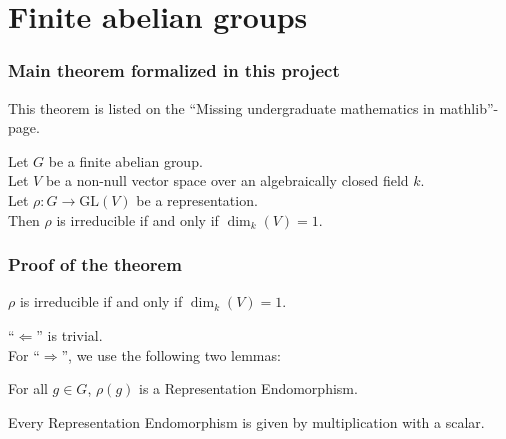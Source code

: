 \documentclass{beamer}
\newcommand{\GL}{\text{GL}}
\begin{document}
\section{Finite abelian groups}
\begin{frame}
\frametitle{Main theorem formalized in this project}
This theorem is listed on the \enquote{Missing undergraduate mathematics in mathlib}-page.
\pause
\begin{theorem}
Let \(G\) be a finite abelian group.\\
Let \(V\) be a non-null vector space over an algebraically closed field \(k\).\\
Let \(\rho: G \to \GL (V)\) be a representation.\\
\pause
\vspace{1cm}
Then \(\rho\) is irreducible if and only if \(\dim_k(V) = 1\).
\end{theorem}
\end{frame}

\begin{frame}
\frametitle{Proof of the theorem}
\begin{theorem}
\(\rho\) is irreducible if and only if \(\dim_k(V) = 1\).
\end{theorem}
\pause
\enquote{\(\Leftarrow\)} is trivial.\\
\pause
For \enquote{\(\Rightarrow\)}, we use the following two lemmas:
\begin{lemma}
For all \(g \in G\), \(\rho(g)\) is a Representation Endomorphism.
\end{lemma}
\pause
\begin{lemma}
Every Representation Endomorphism is given by multiplication with a scalar.
\end{lemma}
\end{frame}

\end{document}
